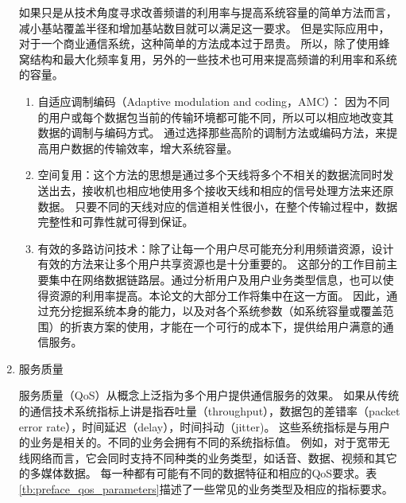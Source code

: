 \begin{enumerate}[1)]
如果只是从技术角度寻求改善频谱的利用率与提高系统容量的简单方法而言，减小基站覆盖半径和增加基站数目就可以满足这一要求。
但是实际应用中，对于一个商业通信系统，这种简单的方法成本过于昂贵。
所以，除了使用蜂窝结构和最大化频率复用，另外的一些技术也可用来提高频谱的利用率和系统的容量。
\begin{enumerate}[(1)]
\item 自适应调制编码（Adaptive modulation and coding，AMC）：
因为不同的用户或每个数据包当前的传输环境都可能不同，所以可以相应地改变其数据的调制与编码方式。
通过选择那些高阶的调制方法或编码方法，来提高用户数据的传输效率，增大系统容量。
\item 空间复用：这个方法的思想是通过多个天线将多个不相关的数据流同时发送出去，接收机也相应地使用多个接收天线和相应的信号处理方法来还原数据。
只要不同的天线对应的信道相关性很小，在整个传输过程中，数据完整性和可靠性就可得到保证。
\item 有效的多路访问技术：除了让每一个用户尽可能充分利用频谱资源，设计有效的方法来让多个用户共享资源也是十分重要的。
这部分的工作目前主要集中在网络数据链路层。通过分析用户及用户业务类型信息，也可以使得资源的利用率提高。本论文的大部分工作将集中在这一方面。
因此，通过充分挖掘系统本身的能力，以及对各个系统参数（如系统容量或覆盖范围）的折衷方案的使用，才能在一个可行的成本下，提供给用户满意的通信服务。
\end{enumerate}
\item{服务质量}

服务质量（QoS）从概念上泛指为多个用户提供通信服务的效果。
如果从传统的通信技术系统指标上讲是指吞吐量（throughput），数据包的差错率（packet error rate），时间延迟（delay），时间抖动（jitter)。
这些系统指标是与用户的业务是相关的。不同的业务会拥有不同的系统指标值。
例如，对于宽带无线网络而言，它会同时支持不同种类的业务类型，如话音、数据、视频和其它的多媒体数据。
每一种都有可能有不同的数据特征和相应的QoS要求。表\ref{tb:preface_qos_parameters}描述了一些常见的业务类型及相应的指标要求。


\end{enumerate}
